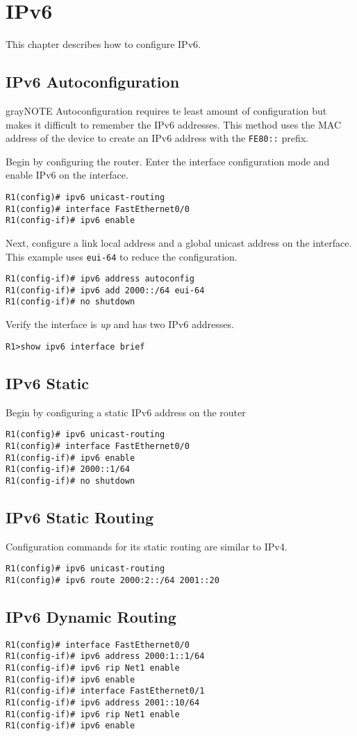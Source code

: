 \section{IPv6}
This chapter describes how to configure IPv6.

\subsection{IPv6 Autoconfiguration}
\begin{textbox}{gray}{NOTE}
Autoconfiguration requires te least amount of configuration but makes it difficult to remember the IPv6 addresses.
This method uses the MAC address of the device to create an IPv6 address with the \verb!FE80::! prefix.
\end{textbox}
Begin by configuring the router. Enter the interface configuration mode and enable IPv6 on the interface.
\begin{verbatim}
R1(config)# ipv6 unicast-routing
R1(config)# interface FastEthernet0/0
R1(config-if)# ipv6 enable
\end{verbatim}
Next, configure a link local address and a global unicast address on the interface. This example uses \verb!eui-64! to reduce the configuration.
\begin{verbatim}
R1(config-if)# ipv6 address autoconfig
R1(config-if)# ipv6 add 2000::/64 eui-64
R1(config-if)# no shutdown
\end{verbatim}
Verify the interface is \textit{up} and has two IPv6 addresses.
\begin{verbatim}
R1>show ipv6 interface brief
\end{verbatim}

\subsection{IPv6 Static}
Begin by configuring a static IPv6 address on the router
\begin{verbatim}
R1(config)# ipv6 unicast-routing
R1(config)# interface FastEthernet0/0
R1(config-if)# ipv6 enable
R1(config-if)# 2000::1/64
R1(config-if)# no shutdown
\end{verbatim}

\subsection{IPv6 Static Routing}
Configuration commands for its static routing are similar to IPv4.
\begin{verbatim}
R1(config)# ipv6 unicast-routing
R1(config)# ipv6 route 2000:2::/64 2001::20
\end{verbatim}

\subsection{IPv6 Dynamic Routing}
\begin{verbatim}
R1(config)# interface FastEthernet0/0
R1(config-if)# ipv6 address 2000:1::1/64
R1(config-if)# ipv6 rip Net1 enable
R1(config-if)# ipv6 enable
R1(config-if)# interface FastEthernet0/1
R1(config-if)# ipv6 address 2001::10/64
R1(config-if)# ipv6 rip Net1 enable
R1(config-if)# ipv6 enable
\end{verbatim}
